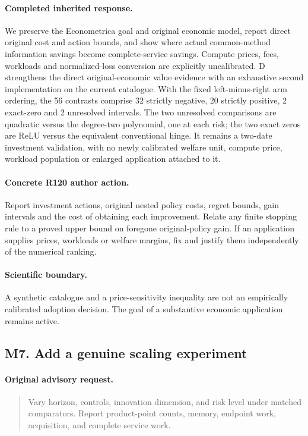 \paragraph{Completed inherited response.}
We preserve the Econometrica goal and original economic model, report direct original cost and action bounds, and show where actual common-method information savings become complete-service savings. Compute prices, fees, workloads and normalized-loss conversion are explicitly uncalibrated. D strengthens the direct original-economic value evidence with an exhaustive second implementation on the current catalogue. With the fixed left-minus-right arm ordering, the 56 contrasts comprise 32 strictly negative, 20 strictly positive, 2 exact-zero and 2 unresolved intervals. The two unresolved comparisons are quadratic versus the degree-two polynomial, one at each risk; the two exact zeros are ReLU versus the equivalent conventional hinge. It remains a two-date investment validation, with no newly calibrated welfare unit, compute price, workload population or enlarged application attached to it.
\paragraph{Concrete R120 author action.}
Report investment actions, original nested policy costs, regret bounds, gain intervals and the cost of obtaining each improvement. Relate any finite stopping rule to a proved upper bound on foregone original-policy gain. If an application supplies prices, workloads or welfare margins, fix and justify them independently of the numerical ranking.
\paragraph{Scientific boundary.}
A synthetic catalogue and a price-sensitivity inequality are not an empirically calibrated adoption decision. The goal of a substantive economic application remains active.

\subsection{M7. Add a genuine scaling experiment}
\label{response120:M7}
\paragraph{Original advisory request.}
\begin{quote}
Vary horizon, controls, innovation dimension, and risk level under matched comparators. Report product-point counts, memory, endpoint work, acquisition, and complete service work.
\end{quote}
